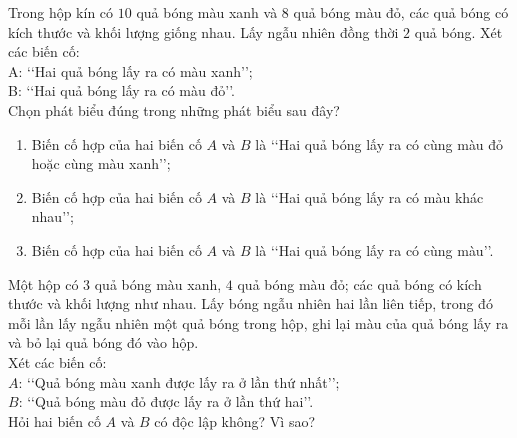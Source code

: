 \begin{bt}%
	Trong hộp kín có $10$ quả bóng màu xanh và $8$ quả bóng màu đỏ, các quả bóng có kích thước và khối lượng giống nhau. Lấy ngẫu nhiên đồng thời $2$ quả bóng. Xét các biến cố:\\
	A: \lq\lq  Hai quả bóng lấy ra có màu xanh\rq\rq;\\
	B: \lq\lq  Hai quả bóng lấy ra có màu đỏ\rq\rq.\\
	Chọn phát biểu đúng trong những phát biểu sau đây?
	\begin{enumerate}
	\item Biến cố hợp của hai biến cố $A$ và $B$ là \lq\lq  Hai quả bóng lấy ra có cùng màu đỏ hoặc cùng màu xanh\rq\rq;
	\item Biến cố hợp của hai biến cố $A$ và $B$ là \lq\lq  Hai quả bóng lấy ra có màu khác nhau\rq\rq;
	\item Biến cố hợp của hai biến cố $A$ và $B$ là \lq\lq  Hai quả bóng lấy ra có cùng màu\rq\rq.
	\end{enumerate}
\end{bt}
\begin{bt}%
	Một hộp có $3$ quả bóng màu xanh, $4$ quả bóng màu đỏ; các quả bóng có kích thước và khối lượng như nhau. Lấy bóng ngẫu nhiên hai lần liên tiếp, trong đó mỗi lần lấy ngẫu nhiên một quả bóng trong hộp, ghi lại màu của quả bóng lấy ra và bỏ lại quả bóng đó vào hộp.\\
	Xét các biến cố:\\
	$A$: \lq\lq  Quả bóng màu xanh được lấy ra ở lần thứ nhất\rq\rq;\\
	$B$: \lq\lq  Quả bóng màu đỏ được lấy ra ở lần thứ hai\rq\rq.\\
	Hỏi hai biến cố $A$ và $B$ có độc lập không? Vì sao?
\end{bt}
